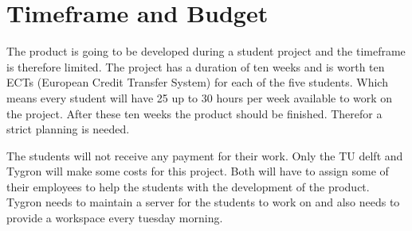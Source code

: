 \section{Timeframe and Budget}
The product is going to be developed during a student project and the timeframe is therefore limited. The project has a duration of ten weeks and is worth ten ECTs (European Credit Transfer System) for each of the five students. Which means every student will have 25 up to 30 hours per week available to work on the project. After these ten weeks the product should be finished. Therefor a strict planning is needed. 
\par
The students will not receive any payment for their work. Only the TU delft and Tygron will make some costs for this project. Both will have to assign some of their employees to help the students with the development of the product. Tygron needs to maintain a server for the students to work on and also needs to provide a workspace every tuesday morning.